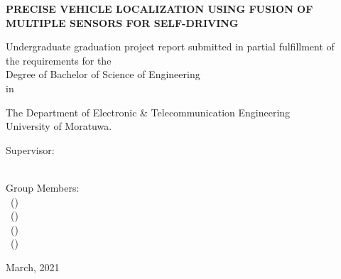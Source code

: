 \begin{titlepage}
  \vspace{1 in}
  \begin{center}
    \large{
    \MakeUppercase{\textbf{Precise Vehicle Localization Using Fusion of Multiple Sensors for Self-Driving}}}\\
    \vspace{1.5 in}
    
    \normalsize
    Undergraduate graduation project report submitted in partial fulfillment of \\
    the requirements for the
\\
    Degree of Bachelor of Science of Engineering \\                                          
    in
\\
    
    \vspace{5mm}
    
    The Department of Electronic \& Telecommunication Engineering
 \\
    University of Moratuwa.
\\
    
    \vspace{50mm}
    
    \begin{flushleft}
    \begin{multicols}{2}
    	Supervisor: \\
    	\supervisorA \\
    	\vfill\null
    	\columnbreak
    	
    	Group Members: \\
    	\memberA \ (\indexA) \\
    	\memberB \ (\indexB) \\
    	\memberC \ (\indexC) \\
    	\memberD \ (\indexD) \\
    	

    \end{multicols}
    \end{flushleft}
    
    
    \vspace{40mm}
    March, 2021\\

  \end{center}
\end{titlepage}
